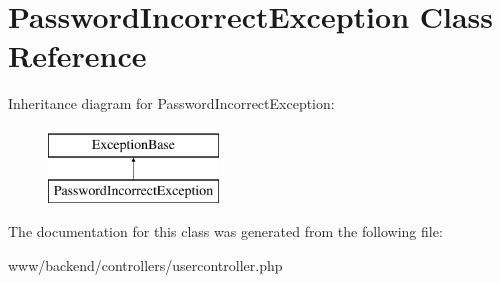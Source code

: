 \hypertarget{classPasswordIncorrectException}{
\section{PasswordIncorrectException Class Reference}
\label{classPasswordIncorrectException}
}
Inheritance diagram for PasswordIncorrectException:\begin{figure}[H]
\begin{center}
\leavevmode
\includegraphics[height=2.000000cm]{classPasswordIncorrectException}
\end{center}
\end{figure}


The documentation for this class was generated from the following file:\begin{DoxyCompactItemize}
\item 
www/backend/controllers/usercontroller.php\end{DoxyCompactItemize}
